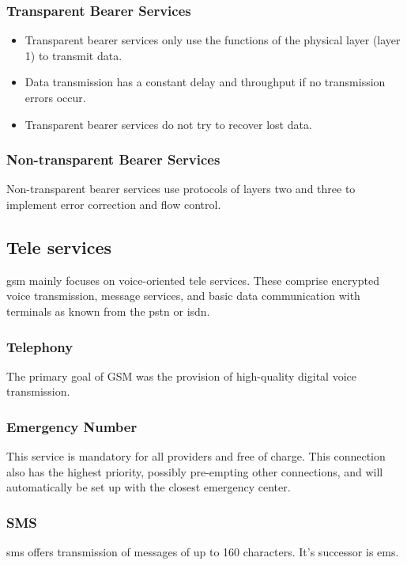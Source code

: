  
 \subsubsection*{Transparent Bearer Services}
 \begin{itemize}
 	\item Transparent bearer services only use the functions of the physical layer (layer 1) to transmit data. 
 	\item Data transmission has a constant delay and throughput if no transmission errors occur.
 	\item Transparent bearer services do not try to recover lost data.
 \end{itemize}

\subsubsection*{Non-transparent Bearer Services}
Non-transparent bearer services use protocols of layers two and three to implement error correction and flow control.

\subsection{Tele services}
\gls{gsm} mainly focuses on voice-oriented tele services. These comprise encrypted voice transmission, message services, and basic data communication with terminals as known from the \gls{pstn} or \gls{isdn}. 


\subsubsection{Telephony}
The primary goal of GSM was the provision of high-quality digital voice transmission.

\subsubsection{Emergency Number}
This service is mandatory for all providers and free of charge. This connection also has the highest priority, possibly pre-empting other connections, and will automatically be set up with the closest emergency center.

\subsubsection{SMS}
\gls{sms} offers transmission of messages of up to 160 characters. It's successor is \gls{ems}.

